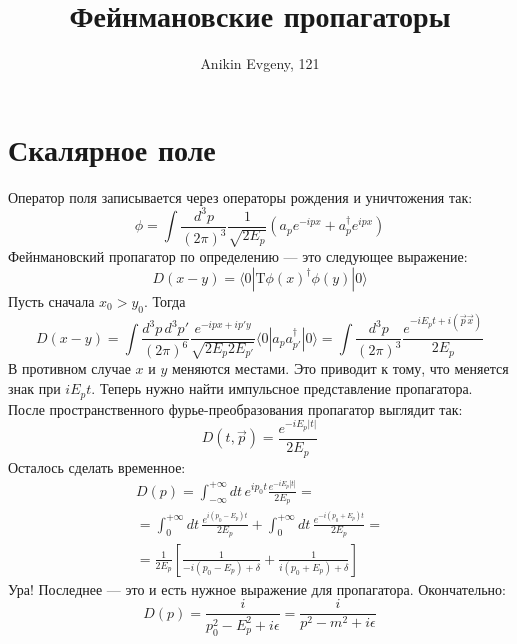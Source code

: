 \documentclass{article}
\title{Фейнмановские пропагаторы}
\author{Anikin Evgeny, 121}
\begin{document}
\maketitle
\section{Скалярное поле}
Оператор поля записывается через операторы рождения и уничтожения так:
\begin{equation}
\phi = \int\frac{d^3 p}{(2\pi)^3} \frac{1}{\sqrt{2E_p}}
	(a_p e^{-ipx} + a^{\dagger}_p e^{ipx})
\end{equation}
Фейнмановский пропагатор по определению --- это следующее выражение:
\begin{equation}
	D(x - y) = \langle 0 | \mathrm{T} \phi(x)^{\dagger} \phi(y) | 0 \rangle
\end{equation}
Пусть сначала $x_0 > y_0$. Тогда 
\begin{equation}
	D(x - y) = \int\frac{d^3 p\, d^3 p'}{(2\pi)^6}\frac{e^{-ipx + ip'y}}{\sqrt{2E_p 2E_{p'}}}
				\langle 0 | a_p a_{p'}^{\dagger} | 0 \rangle = 
					\int\frac{d^3 p}{(2\pi)^3} \frac{e^{-iE_pt + i(\vec{p} \vec{x})}}{2E_p}
\end{equation}
В противном случае $x$ и $y$ меняются местами. Это приводит к тому, что меняется знак при 
$iE_pt$.
Теперь нужно найти импульсное представление пропагатора.
После пространственного фурье-преобразования пропагатор выглядит так:
\begin{equation}
	D(t, \vec{p}) = \frac{e^{-iE_p|t|}}{2E_p}	
\end{equation}
Осталось сделать временное:
\begin{multline}
	D(p) = \int_{-\infty}^{+\infty} dt\, e^{ip_0t} \frac{e^{-iE_p|t|}}{2E_p} = \\
	=	\int_{0}^{+\infty} dt\, \frac{e^{i(p_0 - E_p)t}}{2E_p} + 
		\int_{0}^{+\infty} dt\, \frac{e^{-i(p_0 + E_p)t}}{2E_p} = \\
		= \frac{1}{2E_p} \left[ \frac{1}{-i(p_0 - E_p)  + \delta} + 
				\frac{1}{i(p_0 + E_p) + \delta}\right]
\end{multline}
Ура! Последнее --- это и есть нужное выражение для пропагатора. Окончательно:
\begin{equation}
	D(p) = \frac{i}{p_0^2 - E_p^2 + i\epsilon} = \frac{i}{p^2 - m^2 + i\epsilon}
\end{equation}
\end{document}
